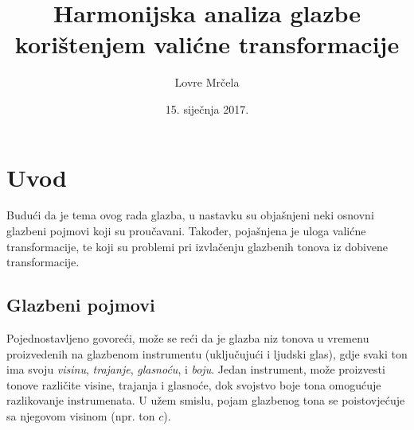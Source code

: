 \documentclass[a4paper, 10pt, twocolumn]{article}
\begin{document}
\date{15. siječnja 2017.}
\title{\Large \bf Harmonijska analiza glazbe korištenjem valićne transformacije} 
\author{Lovre Mrčela}
\maketitle



\section{Uvod}
Budući da je tema ovog rada glazba, u nastavku su objašnjeni neki osnovni glazbeni pojmovi koji su proučavani.
Također, pojašnjena je uloga valićne transformacije, te koji su problemi pri izvlačenju glazbenih tonova iz dobivene transformacije.

\subsection{Glazbeni pojmovi}
Pojednostavljeno govoreći, može se reći da je glazba niz tonova u vremenu proizvedenih na glazbenom instrumentu (uključujući i ljudski glas), gdje svaki ton ima svoju \textit{visinu}, \textit{trajanje}, \textit{glasnoću}, i \textit{boju}.
Jedan instrument, može proizvesti tonove različite visine, trajanja i glasnoće, dok svojstvo boje tona omogućuje razlikovanje instrumenata.
U užem smislu, pojam glazbenog tona se poistovjećuje sa njegovom visinom (npr. ton $c$).
\end{document}
